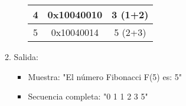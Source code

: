\documentclass[a4paper, 12pt]{article}
\begin{document}
\begin{enumerate}
\begin{enumerate}
\begin{itemize}
\begin{table}[h]
\begin{tabular}{|c|c|c|}
                                \hline
                                4 & 0x10040010 & 3 (1+2) \\
                                \hline
                                5 & 0x10040014 & 5 (2+3) \\
                                \hline
                            \end{tabular}
                        \end{table}
                \end{itemize}
            \item Salida:
                \begin{itemize}
                    \item Muestra: "El número Fibonacci F(5) es: 5"
                    \item Secuencia completa: "0 1 1 2 3 5"
                \end{itemize}
        \end{enumerate}
\end{enumerate}
\end{document}
